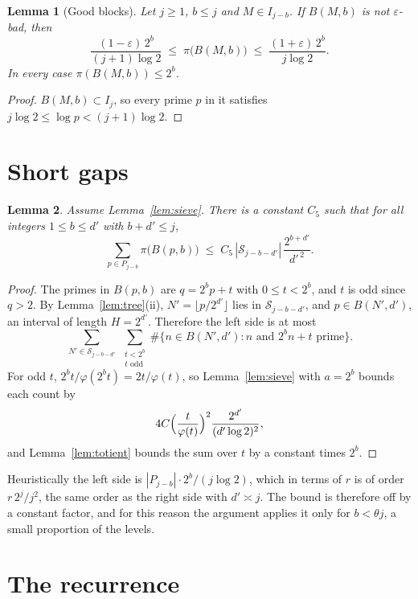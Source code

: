 \documentclass[11pt]{amsart}
\newtheorem{lemma}{Lemma}[section]
\newcommand{\Sset}{\mathcal{S}}
\begin{document}
\begin{lemma}[Good blocks]
\label{lem:good}
Let $j \ge 1$, $b \le j$ and $M \in I_{j-b}$. If $B(M,b)$ is not
$\varepsilon$-bad, then
\[
\frac{(1-\varepsilon)\, 2^b}{(j+1) \log 2} \;\le\; \pi\bigl(B(M,b)\bigr)
\;\le\; \frac{(1+\varepsilon)\, 2^b}{j \log 2}.
\]
In every case $\pi(B(M,b)) \le 2^b$.
\end{lemma}

\begin{proof}
$B(M,b) \subset I_j$, so every prime $p$ in it satisfies $j \log 2 \le
\log p < (j+1)\log 2$.
\end{proof}

\section{Short gaps}
\label{sec:short}

\begin{lemma}
\label{lem:short}
Assume Lemma~\ref{lem:sieve}. There is a constant $C_5$ such that for all
integers $1 \le b \le d'$ with $b + d' \le j$,
\[
\sum_{p \in P_{j-b}} \pi\bigl(B(p, b)\bigr)
\;\le\; C_5\, |\Sset_{j-b-d'}|\, \frac{2^{b+d'}}{d'^{\,2}}.
\]
\end{lemma}

\begin{proof}
The primes in $B(p, b)$ are $q = 2^b p + t$ with $0 \le t < 2^b$, and $t$
is odd since $q > 2$. By Lemma~\ref{lem:tree}(ii), $N' = \lfloor
p/2^{d'}\rfloor$ lies in $\Sset_{j-b-d'}$, and $p \in B(N', d')$, an
interval of length $H = 2^{d'}$. Therefore the left side is at most
\[
\sum_{N' \in \Sset_{j-b-d'}}\ \sum_{\substack{t < 2^b\\ t \text{ odd}}}
\#\bigl\{n \in B(N', d') : n \text{ and } 2^b n + t \text{ prime}\bigr\}.
\]
For odd $t$, $2^b t/\varphi(2^b t) = 2t/\varphi(t)$, so
Lemma~\ref{lem:sieve} with $a = 2^b$ bounds each count by
\[
4C \Bigl(\frac{t}{\varphi(t)}\Bigr)^2 \frac{2^{d'}}{(d' \log 2)^2},
\]
and Lemma~\ref{lem:totient} bounds the sum over $t$ by a constant times
$2^b$.
\end{proof}

Heuristically the left side is $|P_{j-b}| \cdot 2^b/(j\log 2)$, which in
terms of $r$ is of order $r\,2^j/j^2$, the same order as the right side
with $d' \asymp j$. The bound is therefore off by a constant factor, and
for this reason the argument applies it only for $b < \theta j$, a small
proportion of the levels.

\section{The recurrence}
\end{document}
